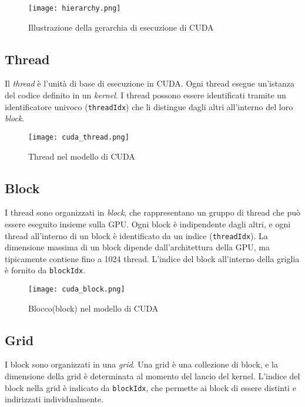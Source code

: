 \documentclass[12pt,a4paper]{report}
\begin{document}
\begin{figure}[h]
    \centering
    \texttt{[image: hierarchy.png]}
    \caption{Illustrazione della gerarchia di esecuzione di CUDA \cite{CUDAhierarchy}}
\end{figure}

\subsection*{Thread}
Il \textit{thread} è l'unità di base di esecuzione in CUDA. Ogni thread esegue un'istanza del codice definito in un \textit{kernel}. I thread possono essere identificati tramite un identificatore univoco (\texttt{threadIdx}) che li distingue dagli altri all'interno del loro \textit{block}.

\begin{figure}[h]
    \centering
    \texttt{[image: cuda\_thread.png]}
    \caption{Thread nel modello di CUDA \cite{CUDA_blog}}
\end{figure}

\subsection*{Block}
I thread sono organizzati in \textit{block}, che rappresentano un gruppo di thread che può essere eseguito insieme sulla GPU. Ogni block è indipendente dagli altri, e ogni thread all'interno di un block è identificato da un indice (\texttt{threadIdx}). La dimensione massima di un block dipende dall'architettura della GPU, ma tipicamente contiene fino a 1024 thread. L'indice del block all'interno della griglia è fornito da \texttt{blockIdx}.

\begin{figure}[h]
    \centering
    \texttt{[image: cuda\_block.png]}
    \caption{Blocco(block) nel modello di CUDA \cite{CUDA_blog}}
\end{figure}



\subsection*{Grid}
I block sono organizzati in una \textit{grid}. Una grid è una collezione di block, e la dimensione della grid è determinata al momento del lancio del kernel. L'indice del block nella grid è indicato da \texttt{blockIdx}, che permette ai block di essere distinti e indirizzati individualmente.
\end{document}
